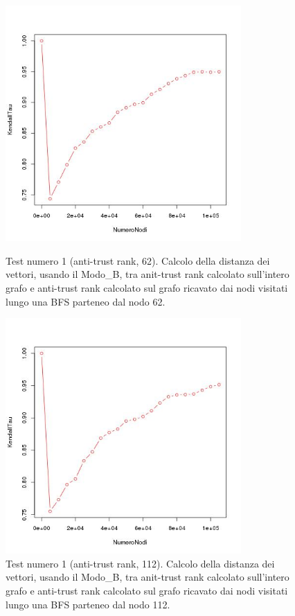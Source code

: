  \begin{figure}
\centering
 \includegraphics[height=9cm]{immagini/test1/antiTrustrankTestMode1_62}
 \caption{Test numero 1 (anti-trust rank, 62). Calcolo della distanza dei vettori, usando il Modo\_B, tra anit-trust rank calcolato sull'intero grafo e anti-trust rank calcolato sul grafo ricavato dai nodi visitati lungo una BFS parteneo dal nodo 62.}
 \label{fig:test1antitrustModoB62}
\centering
 \includegraphics[height=9cm]{immagini/test1/antiTrustrankTestMode1_112}
 \caption{Test numero 1 (anti-trust rank, 112). Calcolo della distanza dei vettori, usando il Modo\_B, tra anit-trust rank calcolato sull'intero grafo e anti-trust rank calcolato sul grafo ricavato dai nodi visitati lungo una BFS parteneo dal nodo 112.}
 \label{fig:test1antitrustModoB112}
\end{figure}

